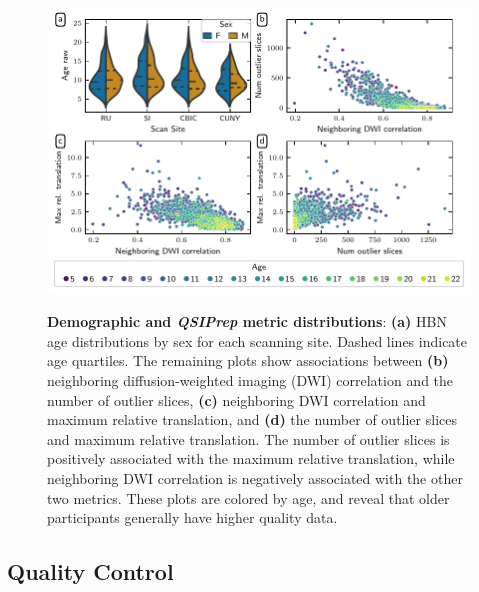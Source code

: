 \documentclass[9pt,lineno]{elife}
\begin{document}
\begin{figure}[tbp]
    {\label{fig:metric-dist:age}}
    {\label{fig:metric-dist:ndc-slices}}
    {\label{fig:metric-dist:ndc-translation}}
    {\label{fig:metric-dist:slices-translation}}
    \centering
    \includegraphics[width=\linewidth]{bundle-profiles/qsiprep-metric-distributions.pdf}
    \caption{%
        {\bf Demographic and \emph{QSIPrep} metric distributions}:
        \textbf{(a)} HBN age distributions by sex for each scanning site. Dashed lines
        indicate age quartiles.
        The remaining plots show associations between \textbf{(b)} neighboring
        diffusion-weighted imaging (DWI) correlation  \citep{yeh2019-kb} and the
        number of outlier slices, \textbf{(c)} neighboring DWI correlation and maximum relative
        translation, and \textbf{(d)} the number of outlier slices and maximum
        relative translation.
        The number of outlier slices is positively associated with the maximum
        relative translation, while neighboring DWI correlation is negatively associated with the other
        two metrics.
        These plots are colored by age, and reveal that older participants
        generally have higher quality data.
    }
    \label{fig:metric-dist}
\end{figure}

\subsection{Quality Control}
\end{document}
